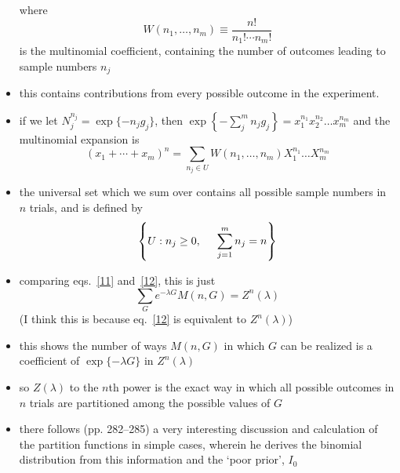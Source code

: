 \documentclass[../jaynes_prob_theory_notes.tex]{subfiles}
\begin{document}
\begin{itemize}
                            where
                            \begin{equation*}
                                W(n_1, \ldots, n_m) \equiv \frac{n!}{n_{1}! \cdots n_{m}!}
                            \end{equation*}
                            is the multinomial coefficient, containing the number of outcomes leading to sample numbers $n_j$
                        \item this contains contributions from every possible outcome in the experiment.
                        \item if we let $N^{n_j}_{j} = \exp \{ -n_j g_j\}$, then $\exp \left \{ - \sum^{m}_{j} n_j g_j \right \} = x^{n_1}_{1} x^{n_2}_{2} \ldots x^{n_m}_{m}$ and the multinomial expansion is
                            \begin{equation}
                                \label{12}
                                {(x_1 + \cdots + x_m)}^n = \sum\limits_{n_j \in U} W(n_1, \ldots, n_m)X^{n_1}_{1} \ldots X^{n_m}_{m}
                            \end{equation}
                        \item the universal set which we sum over contains all possible sample numbers in $n$ trials, and is defined by
                            \begin{equation*}
                                \left \{ U : n_j \geq 0, \hspace{0.5cm} \sum\limits^{m}_{j=1} n_j = n \right \}
                            \end{equation*}
                        \item comparing eqs.~\ref{11} and~\ref{12}, this is just
                            \begin{equation*}
                                \sum\limits_{G} e^{-\lambda G} M(n,G) = Z^{n}(\lambda)
                            \end{equation*}
                            (I think this is because eq.~\ref{12} is equivalent to $Z^{n}(\lambda)$)
                        \item this shows the number of ways $M(n,G)$ in which $G$ can be realized is a coefficient of $\exp \{-\lambda G \}$ in $Z^{n}(\lambda)$
                        \item so $Z(\lambda)$ to the $n$th power is the exact way in which all possible outcomes in $n$ trials are partitioned among the possible values of $G$
                        \item there follows (pp. 282--285) a very interesting discussion and calculation of the partition functions in simple cases, wherein he derives the binomial distribution from this information and the `poor prior', $I_0$

\end{itemize}
\end{document}
